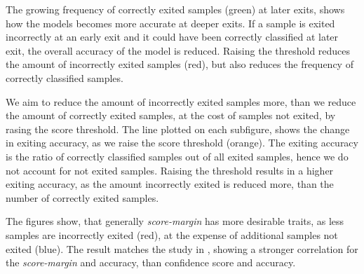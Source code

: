 The growing frequency of correctly exited samples ({\color{sns-green}green}) at later exits, shows how the models becomes more accurate at deeper exits. If a sample is exited incorrectly at an early exit and it could have been correctly classified at later exit, the overall accuracy of the model is reduced. Raising the threshold reduces the amount of incorrectly exited samples ({\color{sns-red}red}), but also reduces the frequency of correctly classified samples. 

We aim to reduce the amount of incorrectly exited samples more, than we reduce the amount of correctly exited samples, at the cost of samples not exited, by rasing the score threshold. The line plotted on each subfigure, shows the change in exiting accuracy, as we raise the score threshold ({\color{sns-orange}orange}). The exiting accuracy is the ratio of correctly classified samples out of all exited samples, hence we do not account for not exited samples. Raising the threshold results in a higher exiting accuracy, as the amount incorrectly exited is reduced more, than the number of correctly exited samples. 

The figures show, that generally \emph{score-margin} has more desirable traits, as less samples are incorrectly exited ({\color{sns-red}red}), at the expense of additional samples not exited ({\color{sns-blue}blue}). The result matches the study in \cite{park_big/little_2015,tann_flexible_2018}, showing a stronger correlation for the \emph{score-margin} and accuracy, than confidence score and accuracy. 

